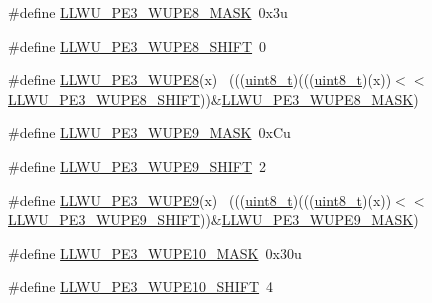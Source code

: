 \begin{DoxyCompactItemize}
\item 
\#define \hyperlink{group___l_l_w_u___register___masks_gabe7fce492e2c0201c4bb5af893f5a63d}{L\+L\+W\+U\+\_\+\+P\+E3\+\_\+\+W\+U\+P\+E8\+\_\+\+M\+A\+SK}~0x3u
\item 
\#define \hyperlink{group___l_l_w_u___register___masks_gaf02591badd7f37915120d0fd627cdf27}{L\+L\+W\+U\+\_\+\+P\+E3\+\_\+\+W\+U\+P\+E8\+\_\+\+S\+H\+I\+FT}~0
\item 
\#define \hyperlink{group___l_l_w_u___register___masks_ga61f1881833fb1eecf76dca9958fe19b2}{L\+L\+W\+U\+\_\+\+P\+E3\+\_\+\+W\+U\+P\+E8}(x)                                            ~(((\hyperlink{_p_e___types_8h_aba7bc1797add20fe3efdf37ced1182c5}{uint8\+\_\+t})(((\hyperlink{_p_e___types_8h_aba7bc1797add20fe3efdf37ced1182c5}{uint8\+\_\+t})(x))$<$$<$\hyperlink{group___l_l_w_u___register___masks_gaf02591badd7f37915120d0fd627cdf27}{L\+L\+W\+U\+\_\+\+P\+E3\+\_\+\+W\+U\+P\+E8\+\_\+\+S\+H\+I\+FT}))\&\hyperlink{group___l_l_w_u___register___masks_gabe7fce492e2c0201c4bb5af893f5a63d}{L\+L\+W\+U\+\_\+\+P\+E3\+\_\+\+W\+U\+P\+E8\+\_\+\+M\+A\+SK})
\item 
\#define \hyperlink{group___l_l_w_u___register___masks_gad03733955d18194da002aeceedc2edf5}{L\+L\+W\+U\+\_\+\+P\+E3\+\_\+\+W\+U\+P\+E9\+\_\+\+M\+A\+SK}~0x\+Cu
\item 
\#define \hyperlink{group___l_l_w_u___register___masks_ga26cad28b7fe4fd2da53ece9d3744016c}{L\+L\+W\+U\+\_\+\+P\+E3\+\_\+\+W\+U\+P\+E9\+\_\+\+S\+H\+I\+FT}~2
\item 
\#define \hyperlink{group___l_l_w_u___register___masks_gac73074d8d4040f05f97c8738c2617350}{L\+L\+W\+U\+\_\+\+P\+E3\+\_\+\+W\+U\+P\+E9}(x)                                            ~(((\hyperlink{_p_e___types_8h_aba7bc1797add20fe3efdf37ced1182c5}{uint8\+\_\+t})(((\hyperlink{_p_e___types_8h_aba7bc1797add20fe3efdf37ced1182c5}{uint8\+\_\+t})(x))$<$$<$\hyperlink{group___l_l_w_u___register___masks_ga26cad28b7fe4fd2da53ece9d3744016c}{L\+L\+W\+U\+\_\+\+P\+E3\+\_\+\+W\+U\+P\+E9\+\_\+\+S\+H\+I\+FT}))\&\hyperlink{group___l_l_w_u___register___masks_gad03733955d18194da002aeceedc2edf5}{L\+L\+W\+U\+\_\+\+P\+E3\+\_\+\+W\+U\+P\+E9\+\_\+\+M\+A\+SK})
\item 
\#define \hyperlink{group___l_l_w_u___register___masks_ga6d8e812233df26a72459712117996efa}{L\+L\+W\+U\+\_\+\+P\+E3\+\_\+\+W\+U\+P\+E10\+\_\+\+M\+A\+SK}~0x30u
\item 
\#define \hyperlink{group___l_l_w_u___register___masks_ga1686c8515045158eeef3fc0c5df480d9}{L\+L\+W\+U\+\_\+\+P\+E3\+\_\+\+W\+U\+P\+E10\+\_\+\+S\+H\+I\+FT}~4
\item 

\end{DoxyCompactItemize}
